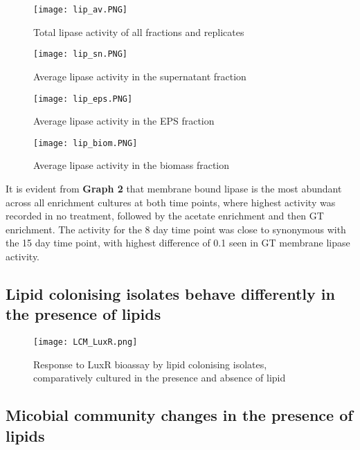 \documentclass[11pt]{article}
\begin{document}
\begin{figure}
\texttt{[image: lip\_av.PNG]}
\caption{Total lipase activity of all fractions and replicates}
\end{figure}

\begin{figure}
\texttt{[image: lip\_sn.PNG]}
\caption{Average lipase activity in the supernatant fraction}
\end{figure}

\begin{figure}
\texttt{[image: lip\_eps.PNG]}
\caption{Average lipase activity in the EPS fraction}
\end{figure}

\begin{figure}
\texttt{[image: lip\_biom.PNG]}
\caption{Average lipase activity in the biomass fraction}
\end{figure}



It is evident from  \textbf{Graph 2} that membrane bound lipase is the most abundant across all enrichment cultures at both time points, where highest activity was recorded in no treatment, followed by the acetate enrichment and then GT enrichment.  The activity for the 8 day time point was close to synonymous with the 15 day time point, with highest difference of 0.1 seen in GT membrane lipase activity.

\subsection{Lipid colonising isolates behave differently in the presence of lipids}

\begin{figure}
\texttt{[image: LCM\_LuxR.png]}
\caption{Response to LuxR bioassay by lipid colonising isolates, comparatively cultured in the presence and absence of lipid }
\end{figure}


\subsection{Micobial community changes in the presence of lipids}
\end{document}
